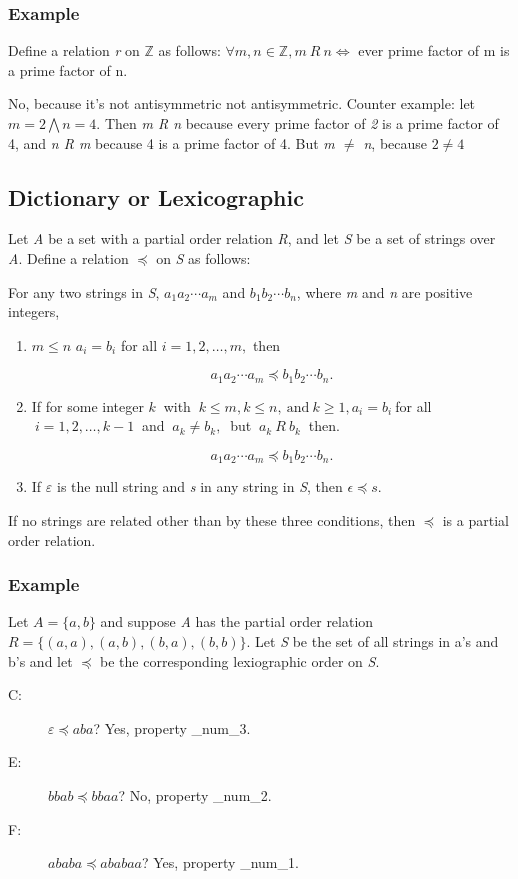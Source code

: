 \documentclass[12pt]{article}
\begin{document}
\subsubsection{Example}
Define a relation \textit{r} on $ \mathbb{Z} $ as follows: $ \forall m, n \in \mathbb{Z}, m \ R \ n \Leftrightarrow$ ever prime factor of m is a prime factor of n.

No, because it's not antisymmetric not antisymmetric. Counter example: let $m = 2 \bigwedge n = 4$. Then \textit{m R n} because every prime factor of \textit{2} is a prime factor of 4, and \textit{n R m} because 4 is a prime factor of 4. But \textit{m $\neq$ n}, because $2 \neq 4$

\subsection{Dictionary or Lexicographic}
Let \textit{A} be a set with a partial order relation \textit{R}, and let \textit{S} be a set of strings over \textit{A}. Define a relation $\preceq$ on \textit{S} as follows:

For any two strings in \textit{S}, $a_1a_2 \cdots a_m$ and $b_1b_2 \cdots b_n$, where \textit{m} and \textit{n} are positive integers,

\begin{enumerate}
\item $m \leq n$ $a_i = b_i$ for all $i = 1, 2, \ldots, m,$ then

\begin{equation*}
a_1a_2 \cdots a_m \preceq b_1b_2 \cdots b_n.
\end{equation*}

\item If for some integer $k \ $ with $\ k \leq m, k \leq n, \ \text{and} \ k \geq 1, a_i = b_i \ $for all$ \ i = 1, 2, \ldots, k - 1 \ $ and $\ a_k \neq b_k, \ $ but $\ a_k \ R \ b_k \ $ then.

\begin{equation*}
a_1a_2 \cdots a_m \preceq b_1b_2 \cdots b_n.
\end{equation*}

\item If $\varepsilon$ is the null string and \textit{s} in any string in \textit{S}, then $\epsilon \preceq s$.
\end{enumerate}

If no strings are related other than by these three conditions, then $\preceq$ is a partial order relation.

\subsubsection{Example}
Let $A = \{ a,b \}$ and suppose \textit{A} has the partial order relation $R = \{ (a, a), (a, b), (b, a), (b, b) \}.$ Let \textit{S} be the set of all strings in a's and b's and let $\preceq$ be the corresponding lexiographic order on \textit{S}.

\begin{description}
\item [C: ] $\varepsilon \preceq aba$? Yes, property \_num_3.
\item [E: ] $bbab \preceq bbaa$? No, property \_num_2.
\item [F: ] $ababa \preceq ababaa$? Yes, property \_num_1.
\end{description}
\end{document}
